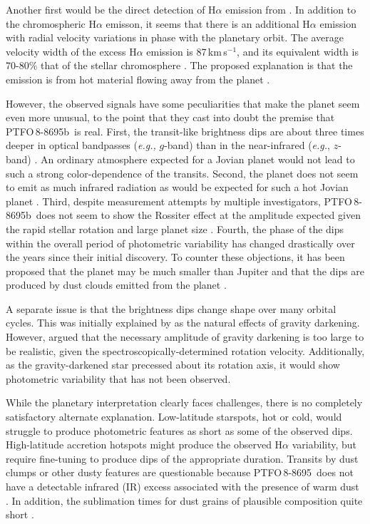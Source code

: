 \documentclass[12pt,twocolumn,tighten,trackchanges]{aastex62}
\newcommand{\ptfo}{PTFO$\,$8-8695}
\newcommand{\ptfob}{PTFO$\,$8-8695b}
\begin{document}
Another first would be the direct detection of H$\alpha$ emission from
\citep{johnskrull_h_2016}.  In addition to the chromospheric H$\alpha$
emisson, it seems that there is an additional H$\alpha$ emission with
radial velocity variations in phase with the planetary orbit.  The
average velocity width of the excess H$\alpha$ emission is
87$\,$km$\,$s$^{-1}$, and its equivalent width is 70-80\% that of the
stellar chromosphere \citep{johnskrull_h_2016}.  The proposed
explanation is that the emission is from hot material flowing away
from the planet \citep{johnskrull_h_2016}.

However, the observed signals have some peculiarities that make the
planet seem even more unusual, to the point that they cast into doubt
the premise that \ptfob\ is real.  First, the transit-like brightness
dips are about three times deeper in optical bandpasses ({\it e.g.,}
$g$-band) than in the near-infrared ({\it e.g.}, $z$-band)
\citep{onitsuka_multicolor_2017,tanimoto_evidence_2020}.  An ordinary
atmosphere expected for a Jovian planet would not lead to such a
strong color-dependence of the transits.  Second, the planet does not
seem to emit as much infrared radiation as would be expected for such
a hot Jovian planet \citep{yu_tests_2015}.  Third, despite measurement
attempts by multiple investigators, \ptfob\ does not seem to show the
Rossiter effect at the amplitude expected given the rapid stellar
rotation and large planet size
\citep{yu_tests_2015,ciardi_followup_2015}.  Fourth, the phase of the
dips within the overall period of photometric variability has changed
drastically over the years since their initial discovery.  To counter
these objections, it has been proposed that the planet may be much
smaller than Jupiter and that the dips are produced by dust clouds
emitted from the planet \citep{tanimoto_evidence_2020}. 

A separate issue is that the brightness dips change shape over many
orbital cycles. This was initially explained by
\cite{barnes_measurement_2013} as the natural effects of gravity
darkening.  However, \cite{howarth_reappraisal_2016} argued that the
necessary amplitude of gravity darkening is too large to be realistic,
given the spectroscopically-determined rotation velocity.
Additionally, as the gravity-darkened star precessed about its
rotation axis, it would show photometric variability that has not been
observed.

While the planetary interpretation clearly faces challenges, there is
no completely satisfactory alternate explanation.  Low-latitude
starspots, hot or cold, would struggle to produce photometric features
as short as some of the observed dips.  High-latitude accretion
hotspots might produce the observed H$\alpha$ variability, but require
fine-tuning to produce dips of the appropriate duration.  Transits by
dust clumps or other dusty features are questionable because \ptfo\
does not have a detectable infrared (IR) excess associated with the
presence of warm dust \citep[{\it e.g.},][Figure~18]{yu_tests_2015}.
In addition, the sublimation times for dust grains of plausible
composition  quite short
\citep{zhan_complex_2019}. 
\end{document}
